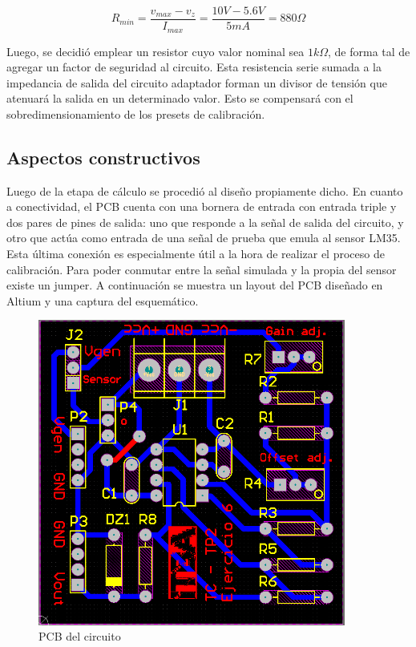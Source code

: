\begin{equation}
    R_{min} = \frac{v_{max}-v_{z}}{I_{max}} = \frac{10V - 5.6V}{5mA} = 880\Omega
    \label{fig:EJ6_ecuacion_resistor_serie}
\end{equation}

Luego, se decidi\'o emplear un resistor cuyo valor nominal sea $1k\Omega$, de forma tal de agregar un factor de seguridad al circuito.
 Esta resistencia serie sumada a la impedancia de salida del circuito adaptador forman un divisor de tensi\'on que atenuar\'a la salida en un determinado valor. Esto se compensar\'a con el sobredimensionamiento de los presets de calibraci\'on.

 \subsection{Aspectos constructivos}

 Luego de la etapa de c\'alculo se procedi\'o al dise\~no propiamente dicho. En cuanto a conectividad, el PCB cuenta con una bornera de entrada con entrada triple y dos pares de pines de salida: uno que responde a la señal de salida del circuito, y otro que actúa como entrada de una señal de prueba que emula al sensor LM35.
  Esta \'ultima conexi\'on es especialmente \'util a la hora de realizar el proceso de calibraci\'on. Para poder conmutar entre la se\~nal simulada y la propia del sensor existe un jumper. A continuaci\'on se muestra un layout del PCB diseñado en Altium y una captura del esquem\'atico.
 
  \begin{figure}[H]
    \centering
    \includegraphics[width=0.9\textwidth]{../EJ6/Captures/EJ6_PCB}
    \caption{PCB del circuito}
    \label{fig:EJ6_PCB} 
\end{figure}
